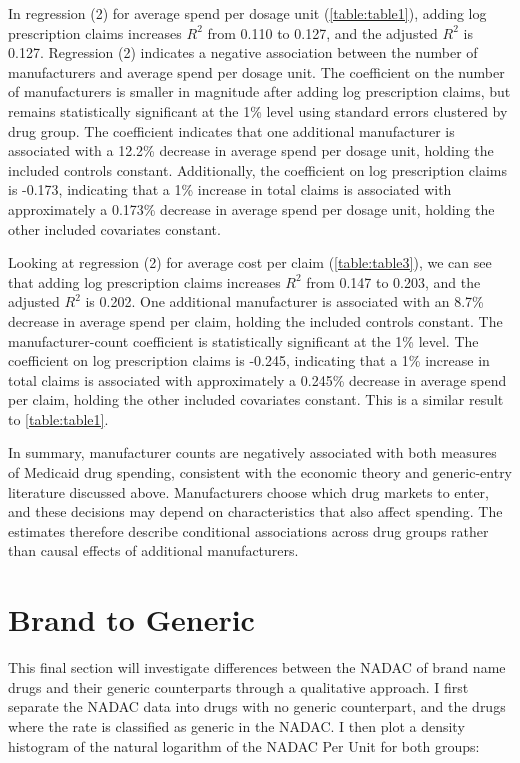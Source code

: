 \documentclass[12pt]{article}
\begin{document}
In regression (2) for average spend per dosage unit (\autoref{table:table1}), adding log prescription claims increases $R^2$ from 0.110 to 0.127, and the adjusted $R^2$ is 0.127. Regression (2) indicates a negative association between the number of manufacturers and average spend per dosage unit. The coefficient on the number of manufacturers is smaller in magnitude after adding log prescription claims, but remains statistically significant at the 1\% level using standard errors clustered by drug group. The coefficient indicates that one additional manufacturer is associated with a 12.2\% decrease in average spend per dosage unit, holding the included controls constant. Additionally, the coefficient on log prescription claims is -0.173, indicating that a 1\% increase in total claims is associated with approximately a 0.173\% decrease in average spend per dosage unit, holding the other included covariates constant. 

Looking at regression (2) for average cost per claim (\autoref{table:table3}), we can see that adding log prescription claims increases $R^2$ from 0.147 to 0.203, and the adjusted $R^2$ is 0.202. One additional manufacturer is associated with an 8.7\% decrease in average spend per claim, holding the included controls constant. The manufacturer-count coefficient is statistically significant at the 1\% level. The coefficient on log prescription claims is -0.245, indicating that a 1\% increase in total claims is associated with approximately a 0.245\% decrease in average spend per claim, holding the other included covariates constant. This is a similar result to \autoref{table:table1}.

In summary, manufacturer counts are negatively associated with both measures of Medicaid drug spending, consistent with the economic theory and generic-entry literature discussed above. Manufacturers choose which drug markets to enter, and these decisions may depend on characteristics that also affect spending. The estimates therefore describe conditional associations across drug groups rather than causal effects of additional manufacturers. 

\section{Brand to Generic}
This final section will investigate differences between the NADAC of brand name drugs and their generic counterparts through a qualitative approach. I first separate the NADAC data into drugs with no generic counterpart, and the drugs where the rate is classified as generic in the NADAC. I then plot a density histogram of the natural logarithm of the NADAC Per Unit for both groups:
\end{document}
